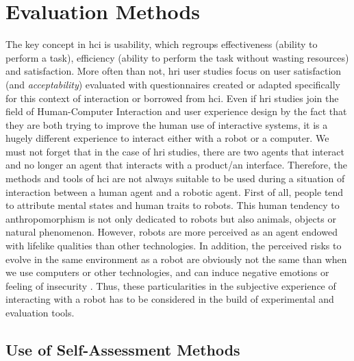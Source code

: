 \documentclass[a4paper,11pt,twoside]{StyleThese}
\begin{document}
\section{Evaluation Methods}
\label{sec:evaluation}

The key concept in \acrshort{hci} is usability, which regroups effectiveness (ability to perform a task), efficiency (ability to perform the task without wasting resources) and satisfaction. More often than not, \acrshort{hri} user studies focus on user satisfaction (and \textit{acceptability}) evaluated with questionnaires created or adapted specifically for this context of interaction or borrowed from \acrshort{hci}. Even if \acrshort{hri} studies join the field of Human-Computer Interaction and user experience design by the fact that they are both trying to improve the human use of interactive systems, it is a hugely different experience to interact either with a robot or a computer. We must not forget that in the case of \acrshort{hri} studies, there are two agents that interact and no longer an agent that interacts with a product/an interface. Therefore, the methods and tools of \acrshort{hci} are not always suitable to be used during a situation of interaction between a human agent and a robotic agent. First of all, people tend to attribute mental states and human traits to robots. This human tendency to anthropomorphism is not only dedicated to robots but also animals, objects or natural phenomenon. However, robots are more perceived as an agent endowed with lifelike qualities than other technologies. 
In addition, the perceived risks to evolve in the same environment as a robot are obviously not the same than when we use computers or other technologies, and can induce negative emotions or feeling of insecurity \cite{dautenhahn2006may}. 
Thus, these particularities in the subjective experience of interacting with a robot has to be considered in the build of experimental and evaluation tools.

\subsection{Use of Self-Assessment Methods}
\end{document}
